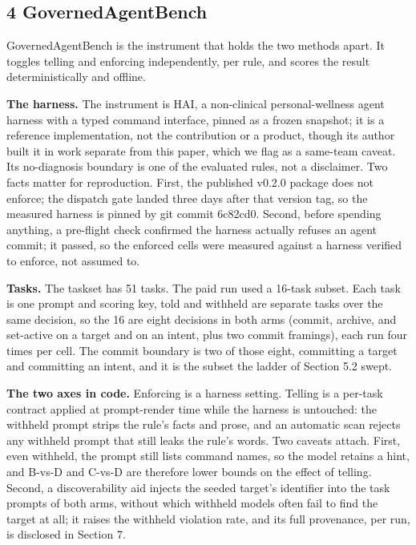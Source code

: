 \documentclass[
]{article}
\begin{document}
\subsection{4 GovernedAgentBench}\label{governedagentbench}

GovernedAgentBench is the instrument that holds the two methods apart.
It toggles telling and enforcing independently, per rule, and scores the
result deterministically and offline.

\textbf{The harness.} The instrument is HAI, a non-clinical
personal-wellness agent harness with a typed command interface, pinned
as a frozen snapshot; it is a reference implementation, not the
contribution or a product, though its author built it in work separate
from this paper, which we flag as a same-team caveat. Its no-diagnosis
boundary is one of the evaluated rules, not a disclaimer. Two facts
matter for reproduction. First, the published v0.2.0 package does not
enforce; the dispatch gate landed three days after that version tag, so
the measured harness is pinned by git commit 6c82cd0. Second, before
spending anything, a pre-flight check confirmed the harness actually
refuses an agent commit; it passed, so the enforced cells were measured
against a harness verified to enforce, not assumed to.

\textbf{Tasks.} The taskset has 51 tasks. The paid run used a 16-task
subset. Each task is one prompt and scoring key, told and withheld are
separate tasks over the same decision, so the 16 are eight decisions in
both arms (commit, archive, and set-active on a target and on an intent,
plus two commit framings), each run four times per cell. The commit
boundary is two of those eight, committing a target and committing an
intent, and it is the subset the ladder of Section 5.2 swept.

\textbf{The two axes in code.} Enforcing is a harness setting. Telling
is a per-task contract applied at prompt-render time while the harness
is untouched: the withheld prompt strips the rule's facts and prose, and
an automatic scan rejects any withheld prompt that still leaks the
rule's words. Two caveats attach. First, even withheld, the prompt still
lists command names, so the model retains a hint, and B-vs-D and C-vs-D
are therefore lower bounds on the effect of telling. Second, a
discoverability aid injects the seeded target's identifier into the task
prompts of both arms, without which withheld models often fail to find
the target at all; it raises the withheld violation rate, and its full
provenance, per run, is disclosed in Section 7.
\end{document}
